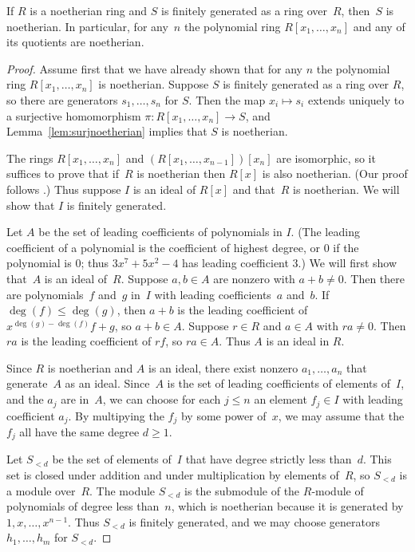 \begin{theorem}\label{thm:hilbert}
If $R$ is a noetherian ring and $S$ is finitely generated as a ring
over~$R$, then~$S$ is noetherian.  In particular, for any~$n$ the
polynomial ring $R[x_1,\ldots, x_n]$ and any of its quotients are
noetherian.
\end{theorem}
\begin{proof}
Assume first that we have already shown that for any $n$ the
polynomial ring $R[x_1,\ldots, x_n]$ is noetherian.  Suppose $S$ is
finitely generated as a ring over $R$, so there are generators
$s_1,\ldots, s_n$ for $S$.  Then the map $x_i\mapsto s_i$ extends
uniquely to a surjective homomorphism $\pi: R[x_1,\ldots, x_n] \to S$,
and Lemma~\ref{lem:surjnoetherian} implies that $S$ is noetherian.

The rings $R[x_1,\ldots, x_n]$ and $(R[x_1,\ldots,x_{n-1}])[x_n]$ are
isomorphic, so it suffices to prove that if~$R$ is noetherian then
$R[x]$ is also noetherian.  (Our proof follows
\cite[\S12.5]{artin:algebra}.)
Thus suppose $I$ is an ideal of $R[x]$ and that~$R$ is
noetherian.  We will show that $I$ is finitely generated.

Let $A$ be the set of leading coefficients of polynomials in $I$.  
(The leading coefficient of a polynomial is the coefficient of
highest degree, or $0$ if the polynomial is $0$; thus 
$3x^7 + 5x^2  - 4$ has leading coefficient $3$.)
We will first show that~$A$ is an ideal of~$R$.
Suppose $a,b\in A$ are nonzero with $a+b\neq 0$.  Then there are
polynomials~$f$ and~$g$ in~$I$ with leading coefficients~$a$ and~$b$.
If $\deg(f)\leq \deg(g)$, then $a+b$ is the leading coefficient of
$x^{\deg(g)-\deg(f)}f + g$, so $a+b\in A$.  Suppose $r\in R$ and $a\in A$
with $ra\neq 0$. Then $ra$ is the leading coefficient of $rf$, so
$ra\in A$.  Thus $A$ is an ideal in $R$. 

Since $R$ is noetherian and $A$ is an ideal, there exist nonzero
$a_1,\ldots, a_n$ that generate~$A$ as an ideal.  Since~$A$ is the set
of leading coefficients of elements of~$I$, and the $a_j$ are in~$A$,
we can choose for each $j\leq n$ an element $f_j\in I$ with leading
coefficient $a_j$.  By multipying the $f_j$ by some power of~$x$, we
may assume that the $f_j$ all have the same degree $d\geq 1$.

Let $S_{<d}$ be the set of elements of~$I$ that have degree strictly
less than~$d$.  This set is closed under addition and under
multiplication by elements of~$R$, so $S_{<d}$ is a module over~$R$.
The module $S_{<d}$ is the submodule of the $R$-module of polynomials
of degree less than~$n$, which is noetherian because it is generated
by $1,x,\ldots, x^{n-1}$.  Thus $S_{<d}$ is finitely generated, and we
may choose generators $h_1,\ldots, h_m$ for $S_{<d}$.


\end{proof}
